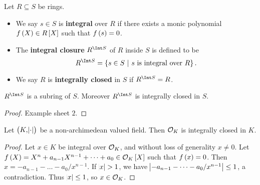 \begin{definition}
Let $ R \subseteq S $ be rings.
\begin{itemize}
\item We say $ s \in S $ is \textbf{integral} over $ R $ if there exists a monic polynomial $ f\br{X} \in R\sbr{X} $ such that $ f\br{s} = 0 $.
\item The \textbf{integral closure} $ R^{\Int S} $ of $ R $ inside $ S $ is defined to be
$$ R^{\Int S} = \cbr{s \in S \st s \ \text{is integral over} \ R}. $$
\item We say $ R $ is \textbf{integrally closed} in $ S $ if $ R^{\Int S} = R $.
\end{itemize}
\end{definition}

\begin{proposition}
$ R^{\Int S} $ is a subring of $ S $. Moreover $ R^{\Int S} $ is integrally closed in $ S $.
\end{proposition}

\begin{proof}
Example sheet $ 2 $.
\end{proof}

\begin{lemma}
\label{lem:6.8}
Let $ \br{K, \abs{\cdot}} $ be a non-archimedean valued field. Then $ \mathcal{O}_K $ is integrally closed in $ K $.
\end{lemma}

\begin{proof}
Let $ x \in K $ be integral over $ \mathcal{O}_K $, and without loss of generality $ x \ne 0 $. Let $ f\br{X} = X^n + a_{n - 1}X^{n - 1} + \dots + a_0 \in \OOO_K\sbr{X} $ such that $ f\br{x} = 0 $. Then $ x = -a_{n - 1} - \dots - a_0 / x^{n - 1} $. If $ \abs{x} > 1 $, we have $ \abs{-a_{n - 1} - \dots - a_0 / x^{n - 1}} \le 1 $, a contradiction. Thus $ \abs{x} \le 1 $, so $ x \in \mathcal{O}_K $.
\end{proof}

\pagebreak

